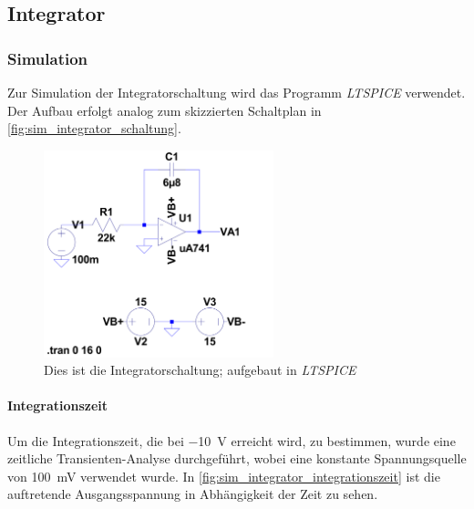 \documentclass[12pt,english,ngerman]{scrartcl}
\begin{document}

\subsection{Integrator}

\subsubsection{Simulation}
Zur Simulation der Integratorschaltung wird das Programm
\textit{LTSPICE} verwendet. Der Aufbau erfolgt analog zum skizzierten
Schaltplan in \autoref{fig:sim_integrator_schaltung}. 

\begin{figure}[H]
  \centering
    \includegraphics[width=\textwidth, height=6cm,keepaspectratio]{./figures/integrator/sim/umkehr_int/schaltung.png}
  \caption{Dies ist die Integratorschaltung; aufgebaut in \textit{LTSPICE}}
  \label{fig:sim_integrator_schaltung}
\end{figure}

\paragraph{Integrationszeit}
Um die Integrationszeit, die bei \SI{-10}{\volt} erreicht wird, zu bestimmen,
wurde eine zeitliche Transienten-Analyse durchgeführt, wobei eine konstante
Spannungsquelle von \SI{100}{\milli\volt} verwendet wurde. In
\autoref{fig:sim_integrator_integrationszeit} ist die auftretende
Ausgangsspannung in Abhängigkeit der Zeit zu sehen.
\end{document}
